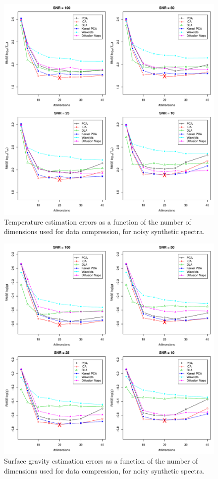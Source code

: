 \documentclass[a4paper,fleqn,usenatbib]{mnras}
\begin{document}
{{{\begin{figure}[ht]
\centering\includegraphics[width=\textwidth]{flamesHR10_Teff_log_BestSVM_N-RMSE_test.pdf}
\caption{Temperature estimation errors as a function of the number of
  dimensions used for data compression, for noisy synthetic
  spectra.}
\label{fig:02}
\end{figure}

\begin{figure}[ht]
\centering\includegraphics[width=\textwidth]{flamesHR10_Logg_log_BestSVM_N-RMSE_test.pdf}
\caption{Surface gravity estimation errors as a function of the number of
  dimensions used for data compression, for noisy synthetic
  spectra.}
\label{fig:04}
\end{figure}

}}}
\end{document}
